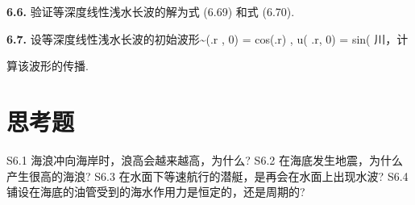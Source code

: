 \noindent\textbf{6.6.} 验证等深度线性浅水长波的解为式 (6.69) 和式 (6.70).

\noindent\textbf{6.7.} 设等深度线性浅水长波的初始波形\textasciitilde{}(.r , 0) = cos(.r) , u( .r, 0) = sin( 川，计

算该波形的传播.

\section*{思考题}

S6.1 海浪冲向海岸时，浪高会越来越高，为什么? S6.2 在海底发生地震，为什么产生很高的海浪? S6.3 在水面下等速航行的潜艇，是再会在水面上出现水波? S6.4 铺设在海底的油管受到的海水作用力是恒定的，还是周期的?
